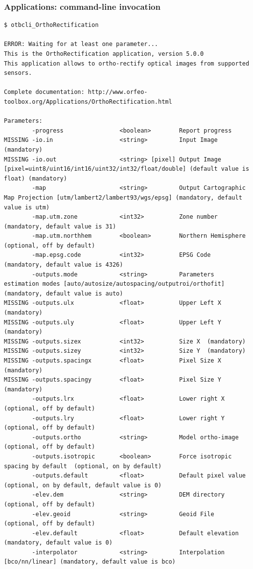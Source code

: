 \documentclass[8pt]{beamer}
\begin{document}
\begin{frame}[fragile]
\frametitle{Applications: command-line invocation}
\begin{scriptsize}
\vspace{-0.5cm}\begin{verbatim}
$ otbcli_OrthoRectification 

ERROR: Waiting for at least one parameter...
This is the OrthoRectification application, version 5.0.0
This application allows to ortho-rectify optical images from supported sensors.

Complete documentation: http://www.orfeo-toolbox.org/Applications/OrthoRectification.html

Parameters: 
        -progress                <boolean>        Report progress 
MISSING -io.in                   <string>         Input Image  (mandatory)
MISSING -io.out                  <string> [pixel] Output Image  [pixel=uint8/uint16/int16/uint32/int32/float/double] (default value is float) (mandatory)
        -map                     <string>         Output Cartographic Map Projection [utm/lambert2/lambert93/wgs/epsg] (mandatory, default value is utm)
        -map.utm.zone            <int32>          Zone number  (mandatory, default value is 31)
        -map.utm.northhem        <boolean>        Northern Hemisphere  (optional, off by default)
        -map.epsg.code           <int32>          EPSG Code  (mandatory, default value is 4326)
        -outputs.mode            <string>         Parameters estimation modes [auto/autosize/autospacing/outputroi/orthofit] (mandatory, default value is auto)
MISSING -outputs.ulx             <float>          Upper Left X  (mandatory)
MISSING -outputs.uly             <float>          Upper Left Y  (mandatory)
MISSING -outputs.sizex           <int32>          Size X  (mandatory)
MISSING -outputs.sizey           <int32>          Size Y  (mandatory)
MISSING -outputs.spacingx        <float>          Pixel Size X  (mandatory)
MISSING -outputs.spacingy        <float>          Pixel Size Y  (mandatory)
        -outputs.lrx             <float>          Lower right X  (optional, off by default)
        -outputs.lry             <float>          Lower right Y  (optional, off by default)
        -outputs.ortho           <string>         Model ortho-image  (optional, off by default)
        -outputs.isotropic       <boolean>        Force isotropic spacing by default  (optional, on by default)
        -outputs.default         <float>          Default pixel value  (optional, on by default, default value is 0)
        -elev.dem                <string>         DEM directory  (optional, off by default)
        -elev.geoid              <string>         Geoid File  (optional, off by default)
        -elev.default            <float>          Default elevation  (mandatory, default value is 0)
        -interpolator            <string>         Interpolation [bco/nn/linear] (mandatory, default value is bco)
\end{verbatim}
\end{scriptsize}
\end{frame}
\end{document}
